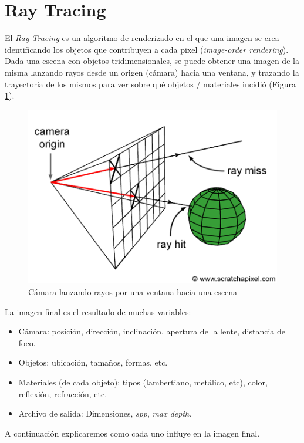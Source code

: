 \section{Ray Tracing} \label{sec:ray-tracing}

El \textit{Ray Tracing} es un algoritmo de renderizado en el que una imagen se
crea identificando los objetos que contribuyen a cada pixel (\textit{image-order
  rendering}). Dada una escena con objetos tridimensionales, se puede obtener una
imagen de la misma lanzando rayos desde un origen (cámara) hacia una ventana, y
trazando la trayectoria de los mismos para ver sobre qué objetos / materiales
incidió (Figura \ref{fig:rt-camera-throwing-rays-into-scene}).

\begin{figure}[H]
  \centering
  \includegraphics[width=.7\textwidth]{imgs/rt-camera-throwing-rays-into-scene.png}
  \caption{Cámara lanzando rayos por una ventana hacia una escena}
  \label{fig:rt-camera-throwing-rays-into-scene}
\end{figure}

La imagen final es el resultado de muchas variables:

\begin{itemize}
  \item Cámara: posición, dirección, inclinación, apertura de la lente,
        distancia de foco.
  \item Objetos: ubicación, tamaños, formas, etc.
  \item Materiales (de cada objeto): tipos (lambertiano, metálico, etc),
        color, reflexión, refracción, etc.
  \item Archivo de salida: Dimensiones, \textit{spp}, \textit{max depth}.
\end{itemize}

A continuación explicaremos como cada uno influye en la imagen final.

